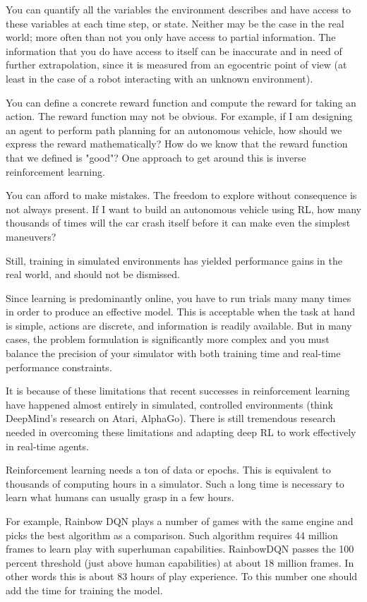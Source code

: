 \documentclass[conference]{IEEEtran}
\begin{document}
You can quantify all the variables the environment describes and have access to these variables at each time step, or state. Neither may be the case in the real world; more often than not you only have access to partial information. The information that you do have access to itself can be inaccurate and in need of further extrapolation, since it is measured from an egocentric point of view (at least in the case of a robot interacting with an unknown environment).

You can define a concrete reward function and compute the reward for taking an action. The reward function may not be obvious. For example, if I am designing an agent to perform path planning for an autonomous vehicle, how should we express the reward mathematically? How do we know that the reward function that we defined is "good"? One approach to get around this is inverse reinforcement learning.

You can afford to make mistakes. The freedom to explore without consequence is not always present. If I want to build an autonomous vehicle using RL, how many thousands of times will the car crash itself before it can make even the simplest maneuvers?

Still, training in simulated environments has yielded performance gains in the real world, and should not be dismissed.

Since learning is predominantly online, you have to run trials many many times in order to produce an effective model. This is acceptable when the task at hand is simple, actions are discrete, and information is readily available. But in many cases, the problem formulation is significantly more complex and you must balance the precision of your simulator with both training time and real-time performance constraints.

It is because of these limitations that recent successes in reinforcement learning have happened almost entirely in simulated, controlled environments (think DeepMind's research on Atari, AlphaGo). There is still tremendous research needed in overcoming these limitations and adapting deep RL to work effectively in real-time agents.

Reinforcement learning needs a ton of data or epochs. This is equivalent to thousands of computing hours in a simulator. Such a long time is necessary to learn what humans can usually grasp in a few hours.

For example, Rainbow DQN plays a number of games with the same engine and picks the best algorithm as a comparison. Such algorithm requires 44 million frames to learn play with superhuman capabilities. RainbowDQN passes the 100 percent threshold (just above human capabilities) at about 18 million frames. In other words this is about 83 hours of play experience. To this number one should add the time for training the model.
\end{document}
